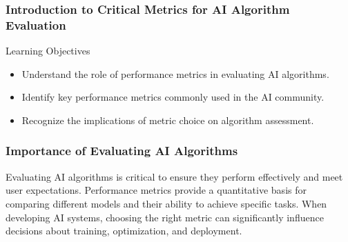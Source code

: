 \documentclass[aspectratio=169]{beamer}
\begin{document}
\frame{\titlepage}

\begin{frame}[fragile]
    \frametitle{Introduction to Critical Metrics for AI Algorithm Evaluation}
    \begin{block}{Learning Objectives}
        \begin{itemize}
            \item Understand the role of performance metrics in evaluating AI algorithms.
            \item Identify key performance metrics commonly used in the AI community.
            \item Recognize the implications of metric choice on algorithm assessment.
        \end{itemize}
    \end{block}
\end{frame}

\begin{frame}[fragile]
    \frametitle{Importance of Evaluating AI Algorithms}
    Evaluating AI algorithms is critical to ensure they perform effectively and meet user expectations. 
    Performance metrics provide a quantitative basis for comparing different models and their ability to achieve specific tasks. 
    When developing AI systems, choosing the right metric can significantly influence decisions about training, optimization, and deployment.
\end{frame}
\end{document}

